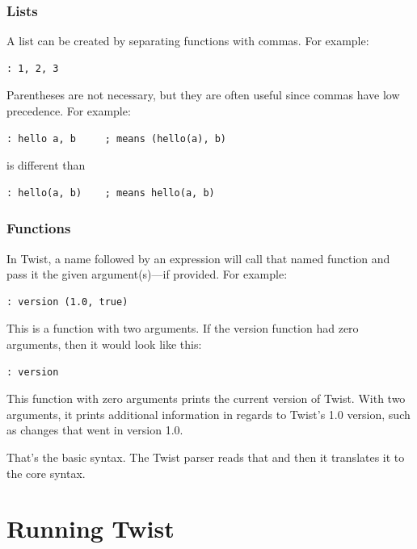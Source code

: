 \subsubsection{Lists}
\label{sec:lists}

A list can be created by separating functions with commas. For example:

\begin{verbatim}
: 1, 2, 3
\end{verbatim}

Parentheses are not necessary, but they are often useful since commas have low precedence. For example:

\begin{verbatim}
: hello a, b     ; means (hello(a), b)
\end{verbatim}

is different than

\begin{verbatim}
: hello(a, b)    ; means hello(a, b)
\end{verbatim}

\subsubsection{Functions}
\label{sec:functions}

In Twist, a name followed by an expression will call that named function and pass it the given argument(s)---if provided. For example:

\begin{verbatim}
: version (1.0, true)
\end{verbatim}

This is a function with two arguments. If the version function had zero arguments, then it would look like this:

\begin{verbatim}
: version
\end{verbatim}

This function with zero arguments prints the current version of Twist. With two arguments, it prints additional information in regards to Twist's 1.0 version, such as changes that went in version 1.0. 

That's the basic syntax. The Twist parser reads that and then it translates it to the core syntax.

\section{Running Twist}
\label{sec:running}

